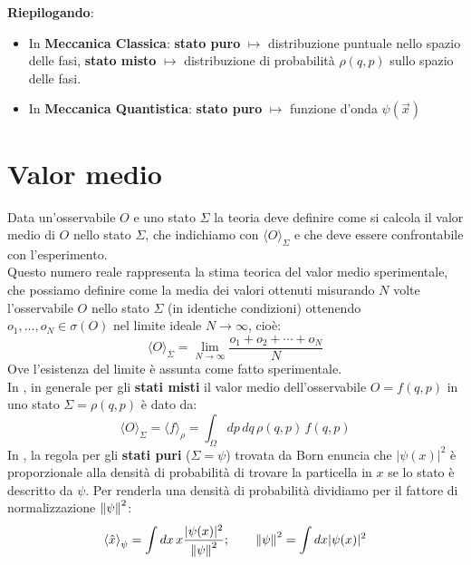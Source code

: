 \documentclass[FisicaTeorica.tex]{subfiles}
\begin{document}
\textbf{Riepilogando}:
\begin{itemize}
    \item In \textbf{Meccanica Classica}: \textbf{stato puro} $\mapsto$ distribuzione  puntuale nello spazio delle fasi, \textbf{stato misto} $\mapsto$ distribuzione di probabilità $\rho(q,p)$ sullo spazio delle fasi.
    \item In \textbf{Meccanica Quantistica}: \textbf{stato puro} $\mapsto$ funzione d'onda $\psi(\vec{x})$
\end{itemize}

\section{Valor medio}
Data un'osservabile $O$ e uno stato $\Sigma$ la teoria deve definire come si calcola il valor medio di $O$ nello stato $\Sigma$, che indichiamo con $\langle O \rangle_\Sigma$ e che deve essere confrontabile con l'esperimento.\\
Questo numero reale rappresenta la stima teorica del valor medio sperimentale, che possiamo definire come la media dei valori ottenuti misurando $N$ volte l'osservabile $O$ nello stato $\Sigma$ (in identiche condizioni) ottenendo $o_1,\dots, o_N\in\sigma(O)$ nel limite ideale $N\to\infty$, cioè:
\begin{equation}
\langle O \rangle_\Sigma =
\lim_{N\to\infty} \frac{o_1+o_2+\cdots +o_N}{N}
\label{eqn:valormediodef}
\end{equation}
Ove l'esistenza del limite è assunta come fatto sperimentale.\\
In \textbf{\MC}, in generale per gli \textbf{stati misti} il valor medio dell'osservabile $O = f(q,p)$ in uno stato $\Sigma = \rho(q,p)$ è dato da:
\begin{equation}
\langle O \rangle_\Sigma = \langle f\rangle_\rho = \int_\Omega dp\,dq\, \rho(q,p)\,f(q,p)
\label{eqn:valor-medio-classico}
\end{equation}
In \textbf{\MQ}, la regola per gli \textbf{stati puri} ($\Sigma = \psi$) trovata da Born enuncia che $|\psi(x)|^2$ è proporzionale alla densità di probabilità di trovare la particella in $x$ se lo stato è descritto da $\psi$. Per renderla una densità di probabilità dividiamo per il fattore di normalizzazione $\left\lVert\psi\right\rVert^2$:
\[
\left\langle{\hat{x}}\right\rangle_\psi = \int dx \,x \frac{|\psi(x)|^2}{\left\lVert\psi\right\rVert^2}; \quad \quad \left\lVert\psi\right\rVert^2 = \int dx |\psi(x)|^2 
\]
\end{document}
